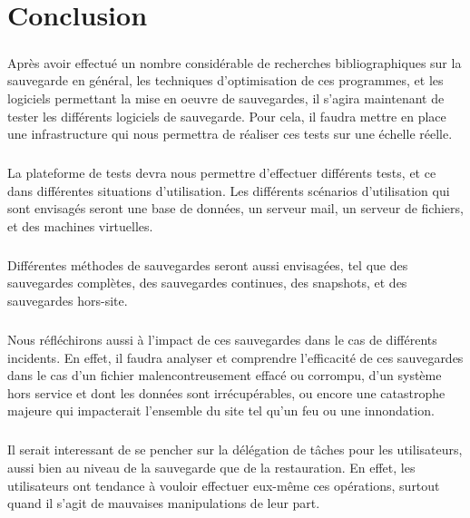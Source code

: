 \documentclass[a4paper,11pt]{report}
\begin{document}
\chapter{Conclusion}

\paragraph{}
Après avoir effectué un nombre considérable de recherches bibliographiques sur la sauvegarde en général, les techniques d'optimisation de ces programmes, et les logiciels permettant la mise en oeuvre de sauvegardes, il s'agira maintenant de tester les différents logiciels de sauvegarde.
Pour cela, il faudra mettre en place une infrastructure qui nous permettra de réaliser ces tests sur une échelle réelle.

\paragraph{}
La plateforme de tests devra nous permettre d'effectuer différents tests, et ce dans différentes situations d'utilisation.
Les différents scénarios d'utilisation qui sont envisagés seront une base de données, un serveur mail, un serveur de fichiers, et des machines virtuelles.

\paragraph{}
Différentes méthodes de sauvegardes seront aussi envisagées, tel que des sauvegardes complètes, des sauvegardes continues, des snapshots, et des sauvegardes hors-site.

\paragraph{}
Nous réfléchirons aussi à l'impact de ces sauvegardes dans le cas de différents incidents.
En effet, il faudra analyser et comprendre l'efficacité de ces sauvegardes dans le cas d'un fichier malencontreusement effacé ou corrompu, d'un système hors service et dont les données sont irrécupérables, ou encore une catastrophe majeure qui impacterait l'ensemble du site tel qu'un feu ou une innondation.

\paragraph{}
Il serait interessant de se pencher sur la délégation de tâches pour les utilisateurs, aussi bien au niveau de la sauvegarde que de la restauration.
En effet, les utilisateurs ont tendance à vouloir effectuer eux-même ces opérations, surtout quand il s'agit de mauvaises manipulations de leur part.
\end{document}
